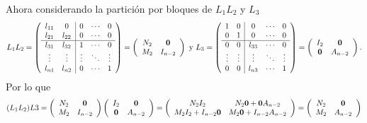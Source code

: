 \documentclass[11pt,letterpaper]{article}
\begin{document}
\begin{enumerate}
\begin{equation*}
\end{equation*}
Ahora considerando la partición por bloques de $L_1L_2$ y $L_3$
\begin{equation*}
L_1L_2= \left( \begin{array}{cc|ccc}
l_{11}&0 & 0 & \cdots &0\\
l_{21}&l_{22}& 0 & \cdots & 0\\ \hline
l_{31}&l_{32}&1& \cdots & 0\\
\vdots & \vdots & \vdots & \ddots & \vdots\\
l_{n1}&l_{n2}&0& \cdots &1
\end{array}\right)=\left( \begin{array}{cc}
N_2& \bf{0}\\
M_2&I_{n-2}\\
\end{array} \right)\ \text{y} \ L_3=\left( \begin{array}{cc|ccc}
1&0 & 0 & \cdots &0\\ 
0&1& 0 & \cdots & 0\\ \hline
0&0&l_{33}& \cdots & 0\\
\vdots & \vdots & \vdots & \ddots & \vdots\\
0&0&l_{n3}& \cdots & 1
\end{array}\right)=\left( \begin{array}{cc}
I_{2}& \bf{0}\\
\bf{0}&A_{n-2}\\
\end{array} \right).
\end{equation*}
Por lo que 
\begin{equation*}
(L_1L_2)L3=\left( \begin{array}{cc}
N_2& \bf{0}\\
M_2&I_{n-2}\\
\end{array} \right)\left( \begin{array}{cc}
I_{2}& \bf{0}\\
\bf{0}&A_{n-2}\\
\end{array} \right)=
\left( \begin{array}{cc}
N_2I_2&N_2\textbf{0}+\textbf{0}A_{n-2}\\
M_2I_2+I_{n-2}\textbf{0}&M_2\textbf{0}+I_{n-2} A_{n-2}
\end{array}\right)=
\left( \begin{array}{cc}
N_2&\bf{0}\\
M_2&A_{n-2}
\end{array}\right)

\end{equation*}
\end{enumerate}
\end{document}
